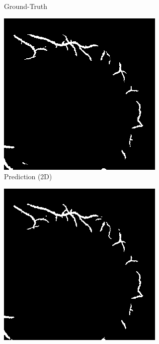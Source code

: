\begin{figure}[H]
\begin{minipage}{.3\textwidth}
\begin{subfigure}{\textwidth}
\caption{Ground-Truth}
\end{subfigure}
\end{minipage}
\begin{minipage}{.3\textwidth}
\begin{subfigure}{\textwidth}
\includegraphics[width=\textwidth]{Pictures/nnUnet/Praxis/Task108-Retina3D/vis/pred2d_008-66.png}
\caption{Prediction (2D)}
\end{subfigure}
\end{minipage}
\begin{minipage}{.3\textwidth}
\begin{subfigure}{\textwidth}
\includegraphics[width=\textwidth]{Pictures/nnUnet/Praxis/Task108-Retina3D/vis/pred3d_008-66.png}

\end{subfigure}
\end{minipage}
\end{figure}
